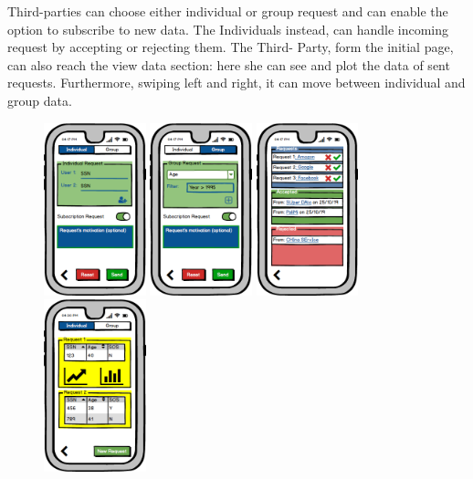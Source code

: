 \documentclass[a4paper]{article}
\begin{document}
Third-parties can choose either individual or group request and can enable the option to subscribe to new data. The Individuals instead, can handle incoming request by accepting or rejecting them. The Third- Party, form the initial page, can also reach the view data section: here she can see and plot the data of sent requests. Furthermore, swiping left and right, it can move between individual and group data.
\begin{figure}[!htpb]		
     	\centering		
     	\includegraphics[height=50mm]{images/mockups/Requests.png}		
     	\includegraphics[height=50mm]{images/mockups/GroupRequest.png}		
     	\includegraphics[height=50mm]{images/mockups/ManageRequests.png}		
     	\includegraphics[height=50mm]{images/mockups/ViewData.png}		

\end{figure}
\end{document}
